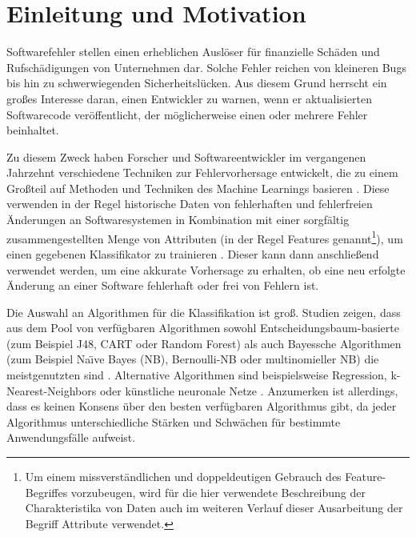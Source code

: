 
\chapter{Einleitung und Motivation}
\label{introduction}

Softwarefehler stellen einen erheblichen Auslöser für finanzielle Schäden und Rufschädigungen von Unternehmen dar. Solche Fehler reichen von kleineren \glqq Bugs\grqq{} bis hin zu schwerwiegenden Sicherheitslücken. Aus diesem Grund herrscht ein großes Interesse daran, einen Entwickler zu warnen, wenn er aktualisierten Softwarecode veröffentlicht, der möglicherweise einen oder mehrere Fehler beinhaltet. 

Zu diesem Zweck haben Forscher und Softwareentwickler im vergangenen Jahrzehnt verschiedene Techniken zur Fehlervorhersage entwickelt, die zu einem Großteil auf Methoden und Techniken des Machine Learnings basieren \cite{Challagulla2008}. Diese verwenden in der Regel historische Daten von fehlerhaften und fehlerfreien Änderungen an Softwaresystemen in Kombination mit einer sorgfältig zusammengestellten Menge von Attributen (in der Regel Features genannt\footnote{Um einem missverständlichen und doppeldeutigen Gebrauch des Feature-Begriffes vorzubeugen, wird für die hier verwendete Beschreibung der Charakteristika von Daten auch im weiteren Verlauf dieser Ausarbeitung der Begriff \glqq Attribute\grqq{} verwendet.}), um einen gegebenen Klassifikator zu trainieren \cite{Alsaeedi2019,Hammouri2018}. Dieser kann dann anschließend verwendet werden, um eine akkurate Vorhersage zu erhalten, ob eine neu erfolgte Änderung an einer Software fehlerhaft oder frei von Fehlern ist.

Die Auswahl an Algorithmen für die Klassifikation ist groß. Studien zeigen, dass aus dem Pool von verfügbaren Algorithmen sowohl Entscheidungsbaum-basierte (zum Beispiel J48, CART oder Random Forest) als auch Bayessche Algorithmen (zum Beispiel Na\"{\i}ve Bayes (NB), Bernoulli-NB oder multinomieller NB) die meistgenutzten sind \cite{Son2019}. Alternative Algorithmen sind beispielsweise Regression, k-Nearest-Neighbors oder künstliche neuronale Netze \cite{Challagulla2008}. Anzumerken ist allerdings, dass es keinen Konsens über den besten verfügbaren Algorithmus gibt, da jeder Algorithmus unterschiedliche Stärken und Schwächen für bestimmte Anwendungsfälle aufweist.

